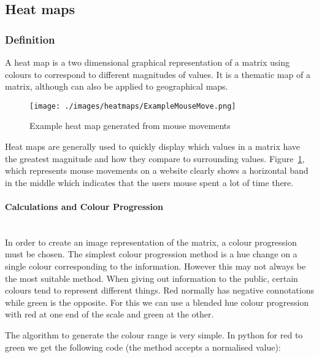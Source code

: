 \subsection{Heat maps}\label{heatmaps}


\subsubsection{Definition}\label{heatmapdefinition}

A heat map is a two dimensional graphical representation of a matrix using colours to correspond to different magnitudes of values. It is a thematic map of a matrix, although can also be applied to geographical maps. 

\begin{figure}[H]
        \begin{center}
                \texttt{[image: ./images/heatmaps/ExampleMouseMove.png]}
                \caption{Example heat map generated from mouse movements}
                \label{fig:mousemoveheatmap}
        \end{center}
\end{figure}

Heat maps are generally used to quickly display which values in a matrix have the greatest magnitude and how they compare to surrounding values. Figure~\ref{fig:mousemoveheatmap}, which represents mouse movements on a website clearly shows a horizontal band in the middle which indicates that the users mouse spent a lot of time there. 

\paragraph{Calculations and Colour Progression} \hspace{0pt} \\


In order to create an image representation of the matrix, a colour progression must be chosen. The simplest colour progression method is a hue change on a single colour corresponding to the information. However this may not always be the most suitable method. When giving out information to the public, certain colours tend to represent different things. Red normally has negative connotations while green is the opposite. For this we can use a blended hue colour progression with red at one end of the scale and green at the other.

The algorithm to generate the colour range is very simple. In python for red to green we get the following code (the method accepts a normalised value):


